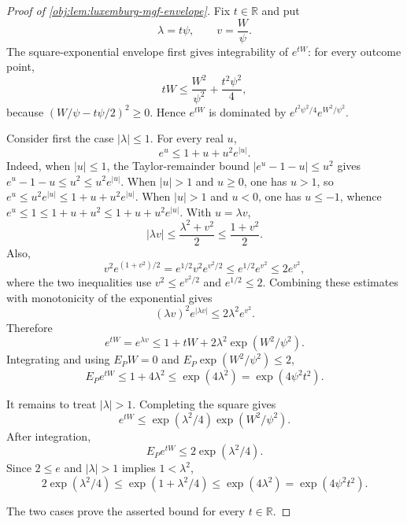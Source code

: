 \begin{proof}[Proof of \cref{obj:lem:luxemburg-mgf-envelope}]
Fix \(t\in\mathbb R\) and put
\[
\lambda=t\psi,\qquad v=\frac{W}{\psi}.
\]
The square-exponential envelope first gives integrability of \(e^{tW}\): for every outcome point,
\[
tW
\le \frac{W^2}{\psi^2}+\frac{t^2\psi^2}{4},
\]
because \((W/\psi-t\psi/2)^2\ge0\).  Hence \(e^{tW}\) is dominated by
\(e^{t^2\psi^2/4}e^{W^2/\psi^2}\). %

Consider first the case \(|\lambda|\le1\).  For every real \(u\),
\[
e^u\le 1+u+u^2e^{|u|}.
\]
Indeed, when \(|u|\le1\), the Taylor-remainder bound
\(|e^u-1-u|\le u^2\) gives \(e^u-1-u\le u^2\le u^2e^{|u|}\).
When \(|u|>1\) and \(u\ge0\), one has \(u>1\), so
\(e^u\le u^2e^{|u|}\le 1+u+u^2e^{|u|}\).  When \(|u|>1\) and
\(u<0\), one has \(u\le-1\), whence \(e^u\le1\le 1+u+u^2\le
1+u+u^2e^{|u|}\). %
With \(u=\lambda v\),
\[
|\lambda v|\le \frac{\lambda^2+v^2}{2}\le \frac{1+v^2}{2}.
\]
Also,
\[
v^2e^{(1+v^2)/2}
=e^{1/2}v^2e^{v^2/2}
\le e^{1/2}e^{v^2}
\le 2e^{v^2},
\]
where the two inequalities use \(v^2\le e^{v^2/2}\) and \(e^{1/2}\le2\).  Combining these estimates with monotonicity of the exponential gives
\[
(\lambda v)^2e^{|\lambda v|}
\le 2\lambda^2e^{v^2}.
\]
Therefore
\[
e^{tW}=e^{\lambda v}
\le 1+tW+2\lambda^2\exp(W^2/\psi^2).
\]
Integrating and using \(E_PW=0\) and \(E_P\exp(W^2/\psi^2)\le2\),
\[
E_Pe^{tW}
\le 1+4\lambda^2
\le \exp(4\lambda^2)
=\exp(4\psi^2t^2).
\]

It remains to treat \(|\lambda|>1\).  Completing the square gives
\[
e^{tW}\le \exp(\lambda^2/4)\exp(W^2/\psi^2).
\]
After integration,
\[
E_Pe^{tW}
\le 2\exp(\lambda^2/4).
\]
Since \(2\le e\) and \(|\lambda|>1\) implies \(1<\lambda^2\),
\[
2\exp(\lambda^2/4)
\le \exp(1+\lambda^2/4)
\le \exp(4\lambda^2)
=\exp(4\psi^2t^2).
\]

The two cases prove the asserted bound for every \(t\in\mathbb R\). %
\end{proof}
